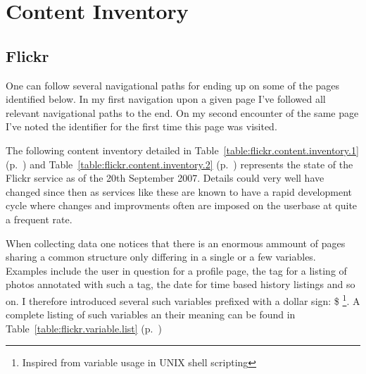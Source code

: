 \chapter{Content Inventory}

\section{Flickr}

One can follow several navigational paths for ending up on some of the pages
identified below. In my first navigation upon a given page I've followed all
relevant navigational paths to the end. On my second encounter of the same
page I've noted the identifier for the first time this page was visited.

The following content inventory detailed in
Table~\ref{table:flickr.content.inventory.1}
(p.~\pageref{table:flickr.content.inventory.1}) and
Table~\ref{table:flickr.content.inventory.2}
(p.~\pageref{table:flickr.content.inventory.2})
represents the state of the Flickr service as of the 20th September 2007.
Details could very well have changed since then as
services like these are known to have a rapid development cycle
where changes and improvments often are imposed on the userbase at quite
a frequent rate.

When collecting data one notices that there is an enormous ammount of pages
sharing a common structure only differing in a single or a few variables.
Examples include
the user in question for a profile page, the tag for a listing of photos
annotated with such a tag, the date for time based history listings and so on.
I therefore introduced several such variables prefixed with a dollar sign: \$
\footnote{Inspired from variable usage in UNIX shell scripting}. A complete
listing of such variables an their meaning can be found in
Table~\ref{table:flickr.variable.list}
(p.~\pageref{table:flickr.variable.list})


